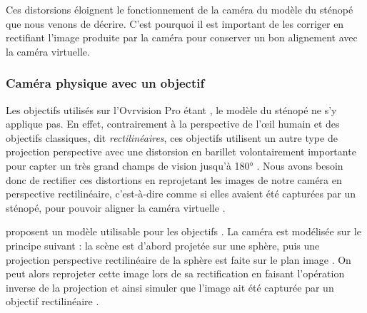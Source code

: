 Ces distorsions éloignent le fonctionnement de la caméra du modèle du sténopé que nous venons de décrire. C'est pourquoi il est important de les corriger en rectifiant l'image produite par la caméra pour conserver un bon alignement avec la caméra virtuelle.

\subsubsection{Caméra physique avec un objectif }
Les objectifs utilisés sur l'Ovrvision Pro étant , le modèle du sténopé ne s'y applique pas. En effet, contrairement à la perspective de l'\oe il humain et des objectifs classiques, dit \emph{rectilinéaires}, ces objectifs utilisent un autre type de projection perspective avec une distorsion en barillet volontairement importante pour capter un très grand champs de vision jusqu'à \ang{180} . Nous avons besoin donc de rectifier ces distortions en reprojetant les images de notre caméra en perspective rectilinéaire, c'est-à-dire comme si elles avaient été capturées par un sténopé, pour pouvoir aligner la caméra virtuelle .


\cite{Mei2007} proposent un modèle utilisable pour les objectifs . La caméra est modélisée sur le principe suivant : la scène est d'abord projetée sur une sphère, puis une projection perspective rectilinéaire de la sphère est faite sur le plan image . On peut alors reprojeter cette image lors de sa rectification en faisant l'opération inverse de la projection et ainsi simuler que l'image ait été capturée par un objectif rectilinéaire .


